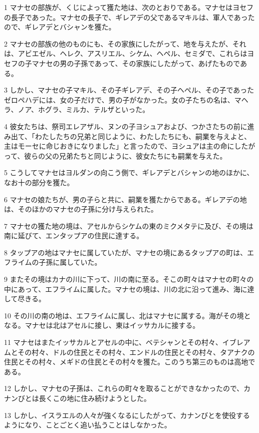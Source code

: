 \par 1 マナセの部族が、くじによって獲た地は、次のとおりである。マナセはヨセフの長子であった。マナセの長子で、ギレアデの父であるマキルは、軍人であったので、ギレアデとバシャンを獲た。
\par 2 マナセの部族の他のものにも、その家族にしたがって、地を与えたが、それは、アビエゼル、ヘレク、アスリエル、シケム、ヘペル、セミダで、これらはヨセフの子マナセの男の子孫であって、その家族にしたがって、あげたものである。
\par 3 しかし、マナセの子マキル、その子ギレアデ、その子ヘペル、その子であったゼロペハデには、女の子だけで、男の子がなかった。女の子たちの名は、マヘラ、ノア、ホグラ、ミルカ、テルザといった。
\par 4 彼女たちは、祭司エレアザル、ヌンの子ヨシュアおよび、つかさたちの前に進み出て、「わたしたちの兄弟と同じように、わたしたちにも、嗣業を与えよと、主はモーセに命じおきになりました」と言ったので、ヨシュアは主の命にしたがって、彼らの父の兄弟たちと同じように、彼女たちにも嗣業を与えた。
\par 5 こうしてマナセはヨルダンの向こう側で、ギレアデとバシャンの地のほかに、なお十の部分を獲た。
\par 6 マナセの娘たちが、男の子らと共に、嗣業を獲たからである。ギレアデの地は、そのほかのマナセの子孫に分け与えられた。
\par 7 マナセの獲た地の境は、アセルからシケムの東のミクメタテに及び、その境は南に延びて、エンタップアの住民に達する。
\par 8 タップアの地はマナセに属していたが、マナセの境にあるタップアの町は、エフライムの子孫に属していた。
\par 9 またその境はカナの川に下って、川の南に至る。そこの町々はマナセの町々の中にあって、エフライムに属した。マナセの境は、川の北に沿って進み、海に達して尽きる。
\par 10 その川の南の地は、エフライムに属し、北はマナセに属する。海がその境となる。マナセは北はアセルに接し、東はイッサカルに接する。
\par 11 マナセはまたイッサカルとアセルの中に、ベテシャンとその村々、イブレアムとその村々、ドルの住民とその村々、エンドルの住民とその村々、タアナクの住民とその村々、メギドの住民とその村々を獲た。このうち第三のものは高地である。
\par 12 しかし、マナセの子孫は、これらの町々を取ることができなかったので、カナンびとは長くこの地に住み続けようとした。
\par 13 しかし、イスラエルの人々が強くなるにしたがって、カナンびとを使役するようになり、ことごとく追い払うことはしなかった。
